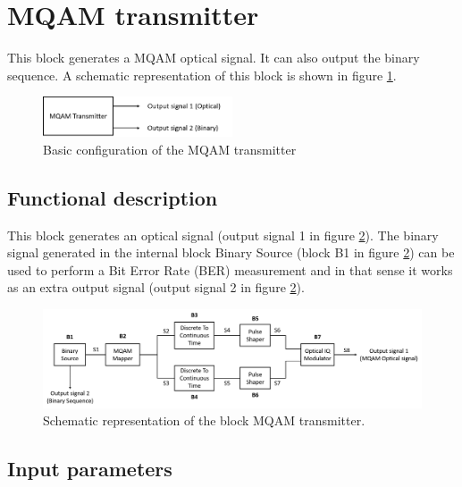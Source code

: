 \clearpage 

\section{MQAM transmitter}

This block generates a MQAM optical signal. It can also output the binary sequence. A schematic representation of this block is shown in figure \ref{MQAM_transmitter_block_diagram_simple}.

\begin{figure}[h]
	\centering
	\includegraphics[width=0.5\textwidth]{figures/MQAM_transmitter_block_diagram_simple}
	\caption{Basic configuration of the MQAM transmitter}\label{MQAM_transmitter_block_diagram_simple}
\end{figure}

\subsection*{Functional description}

This block generates an optical signal (output signal 1 in figure \ref{MQAM_transmitter_block_diagram}). The binary signal generated in the internal block Binary Source (block B1 in figure \ref{MQAM_transmitter_block_diagram}) can be used to perform a Bit Error Rate (BER) measurement and in that sense it works as an extra output signal (output signal 2 in figure \ref{MQAM_transmitter_block_diagram}).

\begin{figure}[h]
	\centering
	\includegraphics[width=\textwidth]{figures/MQAM_transmitter_block_diagram}
	\caption{Schematic representation of the block MQAM transmitter.}\label{MQAM_transmitter_block_diagram}
\end{figure}

\subsection*{Input parameters}

